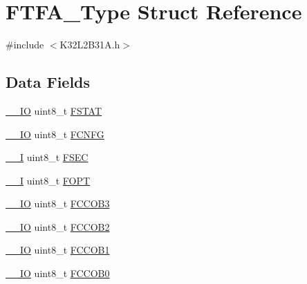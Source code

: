 \hypertarget{struct_f_t_f_a___type}{}\section{F\+T\+F\+A\+\_\+\+Type Struct Reference}
\label{struct_f_t_f_a___type}


{\ttfamily \#include $<$K32\+L2\+B31\+A.\+h$>$}

\subsection*{Data Fields}
\begin{DoxyCompactItemize}
\item 
\mbox{\hyperlink{core__cm0plus_8h_aec43007d9998a0a0e01faede4133d6be}{\+\_\+\+\_\+\+IO}} uint8\+\_\+t \mbox{\hyperlink{struct_f_t_f_a___type_aef000e29f3b219eb64c053000c22fe97}{F\+S\+T\+AT}}
\item 
\mbox{\hyperlink{core__cm0plus_8h_aec43007d9998a0a0e01faede4133d6be}{\+\_\+\+\_\+\+IO}} uint8\+\_\+t \mbox{\hyperlink{struct_f_t_f_a___type_a06f204f3d6e31fa8b5c3af07bc098278}{F\+C\+N\+FG}}
\item 
\mbox{\hyperlink{core__cm0plus_8h_af63697ed9952cc71e1225efe205f6cd3}{\+\_\+\+\_\+I}} uint8\+\_\+t \mbox{\hyperlink{struct_f_t_f_a___type_a9c289cf99054de8442c0847062613f18}{F\+S\+EC}}
\item 
\mbox{\hyperlink{core__cm0plus_8h_af63697ed9952cc71e1225efe205f6cd3}{\+\_\+\+\_\+I}} uint8\+\_\+t \mbox{\hyperlink{struct_f_t_f_a___type_a4a588e9f6d971bfa0ec727d08935c72e}{F\+O\+PT}}
\item 
\mbox{\hyperlink{core__cm0plus_8h_aec43007d9998a0a0e01faede4133d6be}{\+\_\+\+\_\+\+IO}} uint8\+\_\+t \mbox{\hyperlink{struct_f_t_f_a___type_a9a966008c6b3e9777985b820a50c7634}{F\+C\+C\+O\+B3}}
\item 
\mbox{\hyperlink{core__cm0plus_8h_aec43007d9998a0a0e01faede4133d6be}{\+\_\+\+\_\+\+IO}} uint8\+\_\+t \mbox{\hyperlink{struct_f_t_f_a___type_a70dba78a9955734512a852eeea205781}{F\+C\+C\+O\+B2}}
\item 
\mbox{\hyperlink{core__cm0plus_8h_aec43007d9998a0a0e01faede4133d6be}{\+\_\+\+\_\+\+IO}} uint8\+\_\+t \mbox{\hyperlink{struct_f_t_f_a___type_a3b45993d28df53171645290c45bdb55c}{F\+C\+C\+O\+B1}}
\item 
\mbox{\hyperlink{core__cm0plus_8h_aec43007d9998a0a0e01faede4133d6be}{\+\_\+\+\_\+\+IO}} uint8\+\_\+t \mbox{\hyperlink{struct_f_t_f_a___type_a339e554f6ce0e1633a1e07f5ee9fd2ca}{F\+C\+C\+O\+B0}}
\item 

\end{DoxyCompactItemize}
